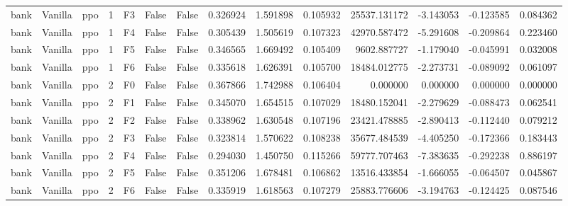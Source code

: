 \begin{tabular}{lllrlllrrrrrrr}
      bank & Vanilla &       ppo &     1 &  F3 &           False &            False &  0.326924 &  1.591898 & 0.105932 &     25537.131172 &          -3.143053 &       -0.123585 &            0.084362 \\
      bank & Vanilla &       ppo &     1 &  F4 &           False &            False &  0.305439 &  1.505619 & 0.107323 &     42970.587472 &          -5.291608 &       -0.209864 &            0.223460 \\
      bank & Vanilla &       ppo &     1 &  F5 &           False &            False &  0.346565 &  1.669492 & 0.105409 &      9602.887727 &          -1.179040 &       -0.045991 &            0.032008 \\
      bank & Vanilla &       ppo &     1 &  F6 &           False &            False &  0.335618 &  1.626391 & 0.105700 &     18484.012775 &          -2.273731 &       -0.089092 &            0.061097 \\
      bank & Vanilla &       ppo &     2 &  F0 &           False &            False &  0.367866 &  1.742988 & 0.106404 &         0.000000 &           0.000000 &        0.000000 &            0.000000 \\
      bank & Vanilla &       ppo &     2 &  F1 &           False &            False &  0.345070 &  1.654515 & 0.107029 &     18480.152041 &          -2.279629 &       -0.088473 &            0.062541 \\
      bank & Vanilla &       ppo &     2 &  F2 &           False &            False &  0.338962 &  1.630548 & 0.107196 &     23421.478885 &          -2.890413 &       -0.112440 &            0.079212 \\
      bank & Vanilla &       ppo &     2 &  F3 &           False &            False &  0.323814 &  1.570622 & 0.108238 &     35677.484539 &          -4.405250 &       -0.172366 &            0.183443 \\
      bank & Vanilla &       ppo &     2 &  F4 &           False &            False &  0.294030 &  1.450750 & 0.115266 &     59777.707463 &          -7.383635 &       -0.292238 &            0.886197 \\
      bank & Vanilla &       ppo &     2 &  F5 &           False &            False &  0.351206 &  1.678481 & 0.106862 &     13516.433854 &          -1.666055 &       -0.064507 &            0.045867 \\
      bank & Vanilla &       ppo &     2 &  F6 &           False &            False &  0.335919 &  1.618563 & 0.107279 &     25883.776606 &          -3.194763 &       -0.124425 &            0.087546 \\

\end{tabular}

